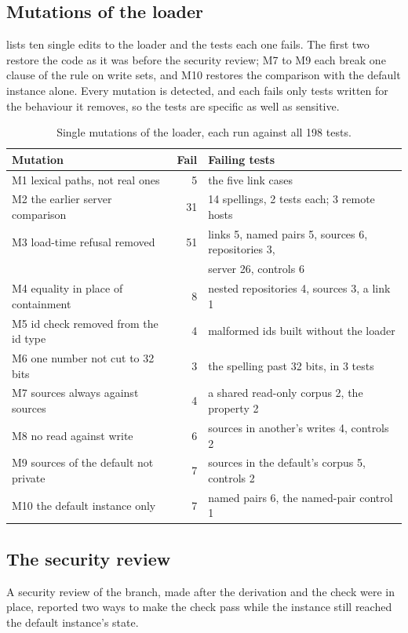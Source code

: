 \documentclass[11pt]{article}
\theoremstyle{plain}
\theoremstyle{definition}
\theoremstyle{remark}
\begin{document}
\subsection{Mutations of the loader}
 lists ten single edits to the loader and the tests each one fails. The first
two restore the code as it was before the security review; M7 to M9 each break one clause of the
rule on write sets, and M10 restores the comparison with the default instance alone. Every mutation
is detected, and each fails only tests written for the behaviour it removes, so the tests are
specific as well as sensitive.

\begin{table}[ht]
\centering\small
\caption{Single mutations of the loader, each run against all 198 tests.}\label{tab:mutations}
\begin{tabular}{@{}lrl@{}}
\toprule
Mutation & Fail & Failing tests \\
\midrule
M1 lexical paths, not real ones & 5 & the five link cases \\
M2 the earlier server comparison & 31 & 14 spellings, 2 tests each; 3 remote hosts \\
M3 load-time refusal removed & 51 & links 5, named pairs 5, sources 6, repositories 3, \\
 & & server 26, controls 6 \\
M4 equality in place of containment & 8 & nested repositories 4, sources 3, a link 1 \\
M5 id check removed from the id type & 4 & malformed ids built without the loader \\
M6 one number not cut to 32 bits & 3 & the spelling past 32 bits, in 3 tests \\
M7 sources always against sources & 4 & a shared read-only corpus 2, the property 2 \\
M8 no read against write & 6 & sources in another's writes 4, controls 2 \\
M9 sources of the default not private & 7 & sources in the default's corpus 5, controls 2 \\
M10 the default instance only & 7 & named pairs 6, the named-pair control 1 \\
\bottomrule
\end{tabular}
\end{table}

\subsection{The security review}\label{sec:audit}
A security review of the branch, made after the derivation and the check were in place, reported
two ways to make the check pass while the instance still reached the default instance's state.
\end{document}

